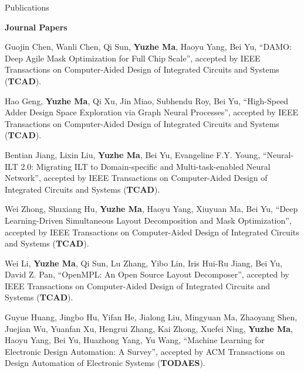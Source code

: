 \begin{rSection}{Publications}

\iffalse
\textbf{Books / Book Chapters}
\begin{description}[font=\normalfont]

\end{description}
\fi

\textbf{Journal Papers}
\begin{description}[font=\normalfont]
\iffalse
\item \textbf{Submitted}

\fi


\item[{[J15]}] {
    Guojin Chen, Wanli Chen, Qi Sun, \textbf{Yuzhe Ma}, Haoyu Yang, Bei Yu,
    ``DAMO: Deep Agile Mask Optimization for Full Chip Scale'',
    accepted by IEEE Transactions on Computer-Aided Design of Integrated Circuits and Systems (\textbf{TCAD}).
}


\item[{[J14]}] {
    Hao Geng, \textbf{Yuzhe Ma}, Qi Xu, Jin Miao, Subhendu Roy, Bei Yu,
    ``High-Speed Adder Design Space Exploration via Graph Neural Processes'',
    accepted by IEEE Transactions on Computer-Aided Design of Integrated Circuits and Systems (\textbf{TCAD}).
}


\item[{[J13]}] {
    Bentian Jiang, Lixin Liu, \textbf{Yuzhe Ma}, Bei Yu, Evangeline F.Y. Young,
    ``Neural-ILT 2.0: Migrating ILT to Domain-specific and Multi-task-enabled Neural Network'',
    accepted by IEEE Transactions on Computer-Aided Design of Integrated Circuits and Systems (\textbf{TCAD}).
}

\item[{[J12]}] {
        Wei Zhong, Shuxiang Hu, \textbf{Yuzhe Ma}, Haoyu Yang, Xiuyuan Ma, Bei Yu,
        ``Deep Learning-Driven Simultaneous Layout Decomposition and Mask Optimization'',
        accepted by IEEE Transactions on Computer-Aided Design of Integrated Circuits and Systems (\textbf{TCAD}).
}

\item[{[J11]}]{
    Wei Li, \textbf{Yuzhe Ma}, Qi Sun, Lu Zhang, Yibo Lin, Iris Hui-Ru Jiang, Bei Yu, David Z. Pan,
    ``OpenMPL: An Open Source Layout Decomposer'',
    accepted by IEEE Transactions on Computer-Aided Design of Integrated Circuits and Systems (\textbf{TCAD}).
}

\item[{[J10]}] {
        Guyue Huang, Jingbo Hu, Yifan He, Jialong Liu, Mingyuan Ma, Zhaoyang Shen, Juejian Wu, Yuanfan Xu, Hengrui Zhang, Kai Zhong, Xuefei Ning, \textbf{Yuzhe Ma}, Haoyu Yang, Bei Yu, Huazhong Yang, Yu Wang,
        ``Machine Learning for Electronic Design Automation: A Survey'',
        accepted by ACM Transactions on Design Automation of Electronic Systems (\textbf{TODAES}).
}


\end{description}
\end{rSection}
